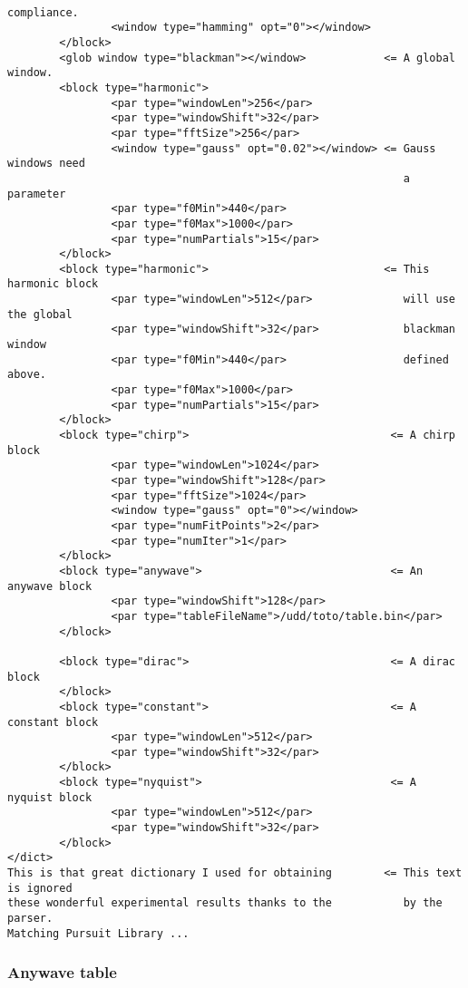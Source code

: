 \documentclass[11pt,a4paper]{article}
\begin{document}
\begin{verbatim}
                                                            compliance.
                <window type="hamming" opt="0"></window>
        </block>
        <glob window type="blackman"></window>            <= A global window.
        <block type="harmonic">
                <par type="windowLen">256</par>
                <par type="windowShift">32</par>
                <par type="fftSize">256</par>
                <window type="gauss" opt="0.02"></window> <= Gauss windows need
                                                             a parameter
                <par type="f0Min">440</par>
                <par type="f0Max">1000</par>
                <par type="numPartials">15</par>
        </block>
        <block type="harmonic">                           <= This harmonic block
                <par type="windowLen">512</par>              will use the global
                <par type="windowShift">32</par>             blackman window
                <par type="f0Min">440</par>                  defined above.
                <par type="f0Max">1000</par>
                <par type="numPartials">15</par>
        </block>
        <block type="chirp">                               <= A chirp block
                <par type="windowLen">1024</par>
                <par type="windowShift">128</par>
                <par type="fftSize">1024</par>
                <window type="gauss" opt="0"></window>
                <par type="numFitPoints">2</par>
                <par type="numIter">1</par>
        </block>
        <block type="anywave">                             <= An anywave block
                <par type="windowShift">128</par>
                <par type="tableFileName">/udd/toto/table.bin</par>
        </block>

        <block type="dirac">                               <= A dirac block
        </block>
        <block type="constant">                            <= A constant block
                <par type="windowLen">512</par>              
                <par type="windowShift">32</par>             
        </block>
        <block type="nyquist">                             <= A nyquist block
                <par type="windowLen">512</par>              
                <par type="windowShift">32</par>             
        </block>
</dict>
This is that great dictionary I used for obtaining        <= This text is ignored
these wonderful experimental results thanks to the           by the parser.
Matching Pursuit Library ...
\end{verbatim}

\subsubsection*{Anywave table}
\end{document}
